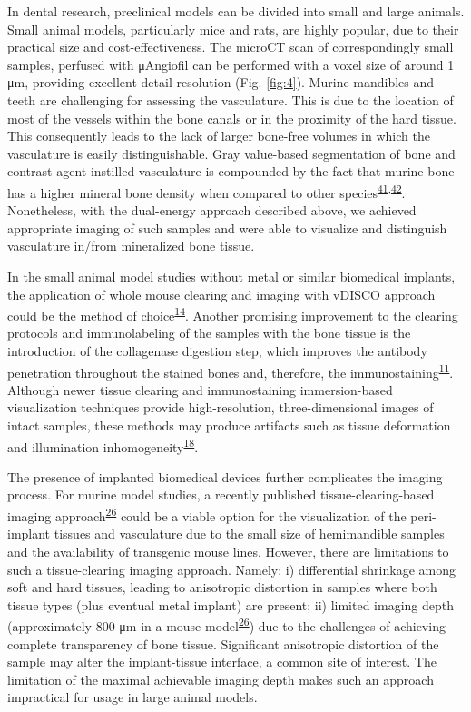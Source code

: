In dental research, preclinical models can be divided into small and large animals.
Small animal models, particularly mice and rats, are highly popular, due to their practical size and cost-effectiveness.
The microCT scan of correspondingly small samples, perfused with μAngiofil can be performed with a voxel size of around 1 μm, providing excellent detail resolution (Fig. \ref{fig:4}).
Murine mandibles and teeth are challenging for assessing the vasculature.
This is due to the location of most of the vessels within the bone canals or in the proximity of the hard tissue.
This consequently leads to the lack of larger bone-free volumes in which the vasculature is easily distinguishable.
Gray value-based segmentation of bone and contrast-agent-instilled vasculature is compounded by the fact that murine bone has a higher mineral bone density when compared to other species\textsuperscript{\protect\hyperlink{ref-FXSWRzX2}{41},\protect\hyperlink{ref-1AEVcopFo}{42}}.
Nonetheless, with the dual-energy approach described above, we achieved appropriate imaging of such samples and were able to visualize and distinguish vasculature in/from mineralized bone tissue.

In the small animal model studies without metal or similar biomedical implants, the application of whole mouse clearing and imaging with vDISCO approach could be the method of choice\textsuperscript{\protect\hyperlink{ref-BNZSaEBe}{14}}.
Another promising improvement to the clearing protocols and immunolabeling of the samples with the bone tissue is the introduction of the collagenase digestion step, which improves the antibody penetration throughout the stained bones and, therefore, the immunostaining\textsuperscript{\protect\hyperlink{ref-ZGzobRpX}{11}}.
Although newer tissue clearing and immunostaining immersion-based visualization techniques provide high-resolution, three-dimensional images of intact samples, these methods may produce artifacts such as tissue deformation and illumination inhomogeneity\textsuperscript{\protect\hyperlink{ref-yP3RkDdM}{18}}.

The presence of implanted biomedical devices further complicates the imaging process.
For murine model studies, a recently published tissue-clearing-based imaging approach\textsuperscript{\protect\hyperlink{ref-11349lK8v}{26}} could be a viable option for the visualization of the peri-implant tissues and vasculature due to the small size of hemimandible samples and the availability of transgenic mouse lines.
However, there are limitations to such a tissue-clearing imaging approach.
Namely:
i) differential shrinkage among soft and hard tissues, leading to anisotropic distortion in samples where both tissue types (plus eventual metal implant) are present;
ii) limited imaging depth (approximately 800 μm in a mouse model\textsuperscript{\protect\hyperlink{ref-11349lK8v}{26}}) due to the challenges of achieving complete transparency of bone tissue.
Significant anisotropic distortion of the sample may alter the implant-tissue interface, a common site of interest.
The limitation of the maximal achievable imaging depth makes such an approach impractical for usage in large animal models.

